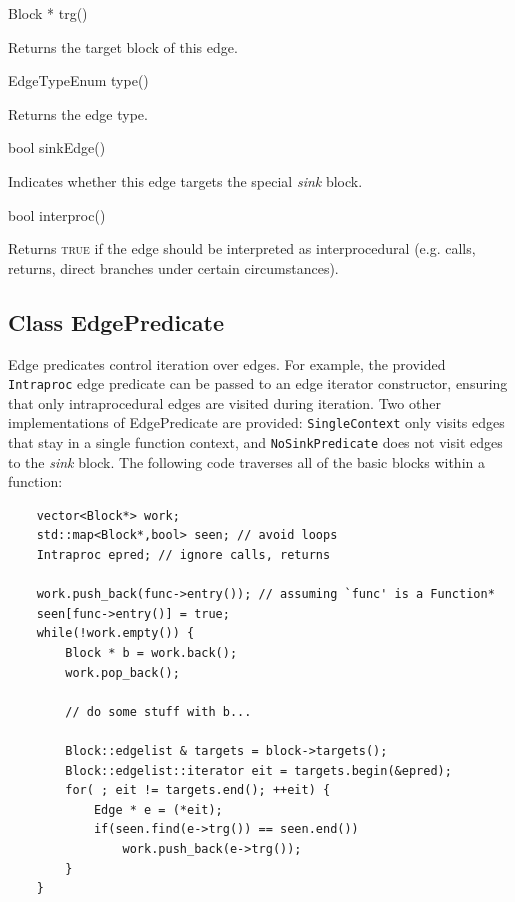 \documentclass{article}
\newenvironment{apient}{\small\verbatim}{\endverbatim}
\newcommand{\apidesc}[1]{%
{\addtolength{\leftskip}{4em}%
#1\par\medskip}
}
\begin{document}
\begin{apient}
Block * trg()
\end{apient}
\apidesc{Returns the target block of this edge.}

\begin{apient}
EdgeTypeEnum type()
\end{apient}
\apidesc{Returns the edge type.}

\begin{apient}
bool sinkEdge()
\end{apient}
\apidesc{Indicates whether this edge targets the special \emph{sink} block.}

\begin{apient}
bool interproc()
\end{apient}
\apidesc{Returns {\scshape true} if the edge should be interpreted as interprocedural (e.g. calls, returns, direct branches under certain circumstances).}

\subsection{Class EdgePredicate}
\label{sec:pred}

Edge predicates control iteration over edges. For example, the provided
\texttt{Intraproc} edge predicate can be passed to an edge iterator
constructor, ensuring that only intraprocedural edges are visited during
iteration. Two other implementations of EdgePredicate are provided: 
\texttt{SingleContext} only visits edges that stay in a single
function context, and \texttt{NoSinkPredicate} does not visit edges to 
the \emph{sink} block.  The following code traverses 
all of the basic blocks within a
function:

\lstset{numbers=left, numberstyle=\tiny, stepnumber=5, numbersep=5pt}
\begin{lstlisting}
    vector<Block*> work;
    std::map<Block*,bool> seen; // avoid loops
    Intraproc epred; // ignore calls, returns
   
    work.push_back(func->entry()); // assuming `func' is a Function*
    seen[func->entry()] = true;
    while(!work.empty()) {
        Block * b = work.back();
        work.pop_back();

        // do some stuff with b...
   
        Block::edgelist & targets = block->targets();
        Block::edgelist::iterator eit = targets.begin(&epred);
        for( ; eit != targets.end(); ++eit) {
            Edge * e = (*eit);
            if(seen.find(e->trg()) == seen.end())
                work.push_back(e->trg());
        }
    } 
\end{lstlisting}
\end{document}
